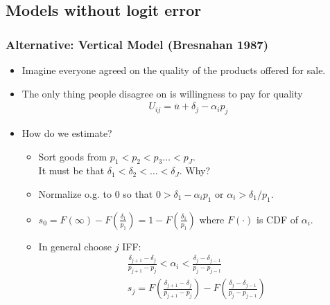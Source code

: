 \documentclass[aspectratio=169,11pt]{beamer}
\begin{document}
\subsection*{Models without logit error}


\begin{frame}
\frametitle{Alternative: Vertical Model (Bresnahan 1987)}
\footnotesize
\begin{itemize}
\item Imagine everyone agreed on the quality of the products offered for sale.
\item The only thing people disagree on is willingness to pay for quality
\begin{eqnarray*}
U_{ij} = \overline{u} + \delta_j - \alpha_i p_j
\end{eqnarray*}
\item How do we estimate?
\begin{itemize}
\item Sort goods from $p_1 < p_2  < p_3 \ldots < p_J$.\\
 It must be that $\delta_1 < \delta_2 < \ldots < \delta_J$. Why?
 \item Normalize o.g. to $0$ so that $ 0 > \delta_1 -\alpha_i p_1$ or $\alpha_i > \delta_1 / p_1$.
 \item $s_0 = F(\infty) - F(\frac{\delta_1}{p_1})  = 1 - F(\frac{\delta_1}{p_1}) $ where $F(\cdot)$ is CDF of $\alpha_i$.
 \item In general choose $j$ IFF:
 \begin{eqnarray*}
 \frac{\delta_{j+1} - \delta_j}{p_{j+1} -p_j} < \alpha_i < \frac{\delta_j  - \delta_{j-1}}{p_j - p_{j-1}}\\
 s_j = F\left(\frac{\delta_{j+1} - \delta_j}{p_{j+1} -p_j} \right) - F\left(\frac{\delta_j  - \delta_{j-1}}{p_j - p_{j-1}} \right)
 \end{eqnarray*}
\end{itemize}
\end{itemize}
\end{frame}
\end{document}
